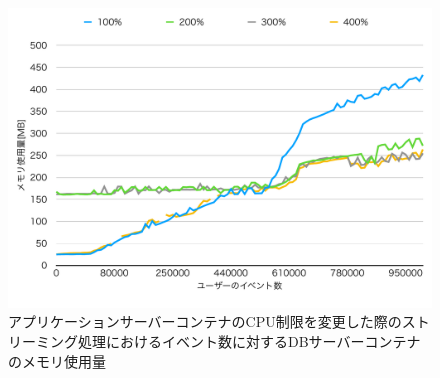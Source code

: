 \documentclass[../../../../../main]{subfiles}
\begin{document}
    \begin{figure}[H]
        \centering
        \includegraphics[width=12cm]{graph}
        \caption{アプリケーションサーバーコンテナのCPU制限を変更した際のストリーミング処理におけるイベント数に対するDBサーバーコンテナのメモリ使用量}
        \label{fig:stream-change-app-cpu-limit-db-memory-app_1024-db_1_1024}
    \end{figure}
\end{document}
